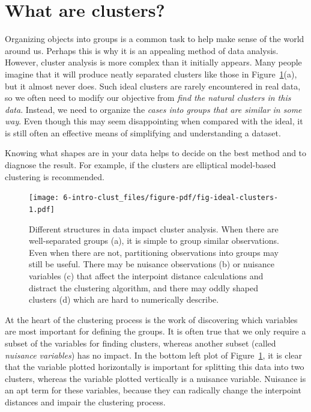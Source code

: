\documentclass[
  letterpaper,
]{krantz}
\begin{document}
\hypertarget{what-are-clusters}{%
\section{What are clusters?}\label{what-are-clusters}}

Organizing objects into groups is a common task to help make sense of
the world around us. Perhaps this is why it is an appealing method of
data analysis. However, cluster analysis is more complex than it
initially appears. Many people imagine that it will produce neatly
separated clusters like those in Figure~\ref{fig-ideal-clusters}(a), but
it almost never does. Such ideal clusters are rarely encountered in real
data, so we often need to modify our objective from \emph{find the
natural clusters in this data}. Instead, we need to organize the
\emph{cases into groups that are similar in some way}. Even though this
may seem disappointing when compared with the ideal, it is still often
an effective means of simplifying and understanding a dataset.

Knowing what shapes are in your data helps to decide on the best method
and to diagnose the result. For example, if the clusters are elliptical
model-based clustering is recommended.

\begin{figure}

{\centering \texttt{[image: 6-intro-clust\_files/figure-pdf/fig-ideal-clusters-1.pdf]}

}

\caption{\label{fig-ideal-clusters}Different structures in data impact
cluster analysis. When there are well-separated groups (a), it is simple
to group similar observations. Even when there are not, partitioning
observations into groups may still be useful. There may be nuisance
observations (b) or nuisance variables (c) that affect the interpoint
distance calculations and distract the clustering algorithm, and there
may oddly shaped clusters (d) which are hard to numerically describe.}

\end{figure}

At the heart of the clustering process is the work of discovering which
variables are most important for defining the groups. It is often true
that we only require a subset of the variables for finding clusters,
whereas another subset (called \emph{nuisance variables}) has no impact.
In the bottom left plot of Figure~\ref{fig-ideal-clusters}, it is clear
that the variable plotted horizontally is important for splitting this
data into two clusters, whereas the variable plotted vertically is a
nuisance variable. Nuisance is an apt term for these variables, because
they can radically change the interpoint distances and impair the
clustering process. 
\end{document}
